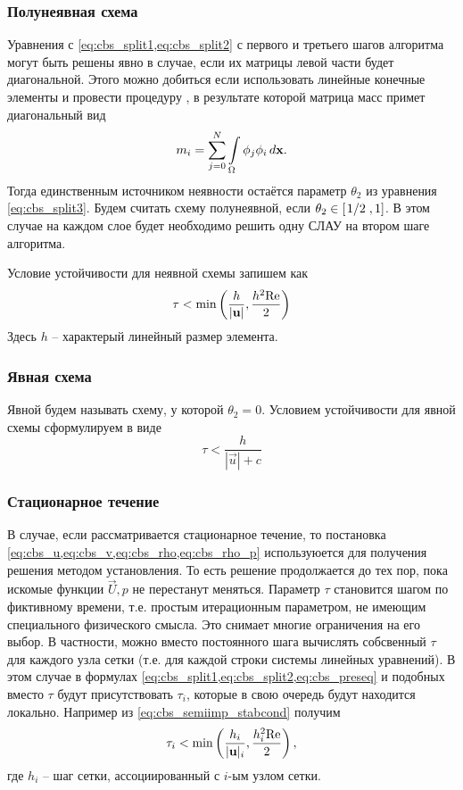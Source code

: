 \subsubsection{Полунеявная схема}
\label{seq:cbs_semiimp}
Уравнения с \cref{eq:cbs_split1,eq:cbs_split2} с
первого и третьего шагов алгоритма могут быть решены явно
в случае, если их матрицы левой части будет диагональной.
Этого можно добиться если использовать
линейные конечные элементы и провести процедуру ,
в результате которой матрица масс примет диагональный вид
$$
m_i = \sum_{j=0}^{N}\displaystyle\int\limits_{\Omega}\phi_j \phi_i \, d \boldsymbol{\rm x}.
$$
Тогда единственным источником неявности
остаётся параметр $\theta_2$ из уравнения \cref{eq:cbs_split3}.
Будем считать схему полунеявной, если $\theta_2 \in [\left.1\middle/2\right., 1]$.
В этом случае на каждом слое будет необходимо решить одну СЛАУ на втором шаге алгоритма.

Условие устойчивости для неявной схемы запишем как
\begin{equation}
\label{eq:cbs_semiimp_stabcond}
\tau < \min\left(\frac{h}{|\boldsymbol{\rm u}|}, \frac{h^2 \mathrm{Re}}{2}\right)
\end{equation}
Здесь $h$ -- характерый линейный размер элемента.

\subsubsection{Явная схема}
\label{seq:cbs_exp}
Явной будем называть схему, у которой $\theta_2 = 0$.
Условием устойчивости для явной схемы сформулируем в виде
\begin{equation}
\label{eq:cbs_exp_stabcond}
\tau < \frac{h}{|\vec u| + c}
\end{equation}

\subsubsection{Стационарное течение}
В случае, если рассматривается
стационарное течение, то постановка \cref{eq:cbs_u,eq:cbs_v,eq:cbs_rho,eq:cbs_rho_p}
используюется для получения решения методом установления.
То есть решение продолжается до тех пор, пока
искомые функции $\vec U, p$ не перестанут меняться.
Параметр $\tau$ становится шагом по фиктивному времени, т.е. простым итерационным параметром,
не имеющим специального физического смысла. Это снимает многие ограничения на его выбор.
В частности, можно вместо постоянного шага вычислять собсвенный $\tau$
для каждого узла сетки (т.е. для каждой строки системы линейных уравнений).
В этом случае в формулах \cref{eq:cbs_split1,eq:cbs_split2,eq:cbs_preseq}
и подобных вместо $\tau$ будут присутствовать $\tau_i$,
которые в свою очередь будут находится локально.
Например из \cref{eq:cbs_semiimp_stabcond} получим
\begin{equation}
\nonumber
\tau_i < \min\left(\frac{h_i}{|\boldsymbol{\rm u}|_i}, \frac{h_i^2 \mathrm{Re}}{2}\right),
\end{equation}
где $h_i$ -- шаг сетки, ассоциированный с $i$-ым узлом сетки.



